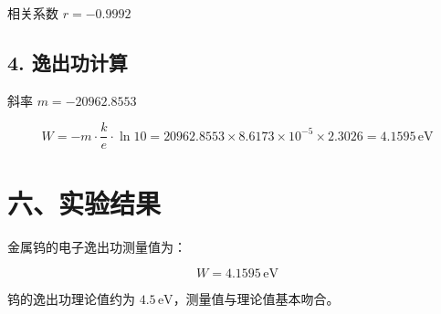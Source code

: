 \documentclass[UTF8,a4paper,zihao=-4]{ctexart}
\begin{document}
相关系数 $r = -0.9992$

\subsection*{4. 逸出功计算}

斜率 $m = -20962.8553$

\begin{equation}
    W = -m \cdot \frac{k}{e} \cdot \ln 10 = 20962.8553 \times 8.6173 \times 10^{-5} \times 2.3026 = 4.1595\,\text{eV}
\end{equation}

\section*{六、实验结果}

金属钨的电子逸出功测量值为：

\begin{equation}
    \boxed{W = 4.1595\,\text{eV}}
\end{equation}

钨的逸出功理论值约为 $4.5\,\text{eV}$，测量值与理论值基本吻合。
\end{document}
